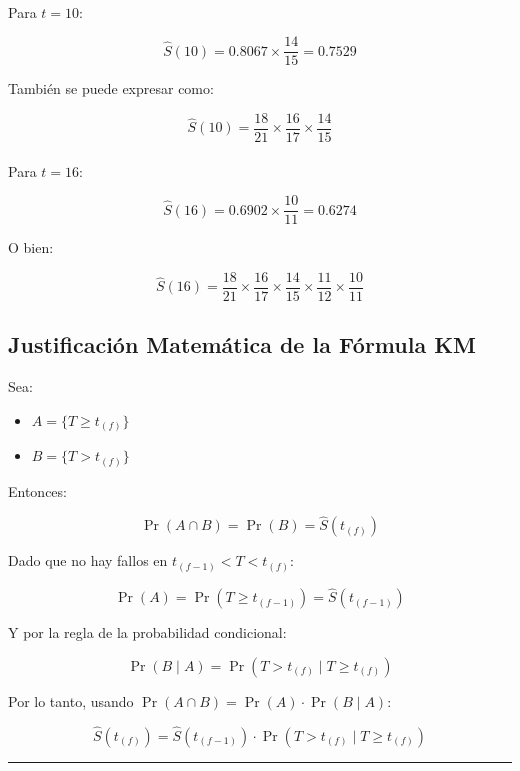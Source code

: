 \documentclass[
]{article}
\makeatletter
\let\oldparagraph\paragraph
\renewcommand{\paragraph}{
    \@ifstar
      \xxxParagraphStar
      \xxxParagraphNoStar
  }
\newcommand{\xxxParagraphStar}[1]{\oldparagraph*{#1}\mbox{}}
\newcommand{\xxxParagraphNoStar}[1]{\oldparagraph{#1}\mbox{}}
\providecommand{\tightlist}{%
  \setlength{\itemsep}{0pt}\setlength{\parskip}{0pt}}
\makeatother
\begin{document}
\paragraph{\texorpdfstring{Para
\(t = 10\):}{Para t = 10:}}\label{para-t-10}

\[
\hat{S}(10) = 0.8067 \times \frac{14}{15} = 0.7529
\]

También se puede expresar como:

\[
\hat{S}(10) = \frac{18}{21} \times \frac{16}{17} \times \frac{14}{15}
\]

\paragraph{\texorpdfstring{Para
\(t = 16\):}{Para t = 16:}}\label{para-t-16}

\[
\hat{S}(16) = 0.6902 \times \frac{10}{11} = 0.6274
\]

O bien:

\[
\hat{S}(16) = \frac{18}{21} \times \frac{16}{17} \times \frac{14}{15} \times \frac{11}{12} \times \frac{10}{11}
\]

\subsection{Justificación Matemática de la Fórmula
KM}\label{justificaciuxf3n-matemuxe1tica-de-la-fuxf3rmula-km}

Sea:

\begin{itemize}
\tightlist
\item
  \(A = \{T \ge t_{(f)}\}\)
\item
  \(B = \{T > t_{(f)}\}\)
\end{itemize}

Entonces:

\[
\Pr(A \cap B) = \Pr(B) = \hat{S}(t_{(f)})
\]

Dado que no hay fallos en \(t_{(f-1)} < T < t_{(f)}\):

\[
\Pr(A) = \Pr(T \ge t_{(f-1)}) = \hat{S}(t_{(f-1)})
\]

Y por la regla de la probabilidad condicional:

\[
\Pr(B \mid A) = \Pr(T > t_{(f)} \mid T \ge t_{(f)})
\]

Por lo tanto, usando \(\Pr(A \cap B) = \Pr(A) \cdot \Pr(B \mid A)\):

\[
\hat{S}(t_{(f)}) = \hat{S}(t_{(f-1)}) \cdot \Pr(T > t_{(f)} \mid T \ge t_{(f)})
\]

\begin{center}\rule{0.5\linewidth}{0.5pt}\end{center}
\end{document}
